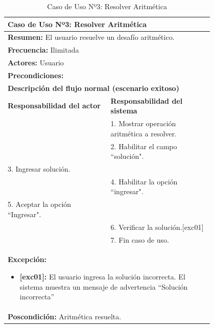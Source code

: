 \begin{table}[H]
    \centering
    \caption{Caso de Uso Nº3: Resolver Aritmética}
    \begin{tabular}{| p{0.4\linewidth} | p{0.4\linewidth} |}
        \hline
        \multicolumn{2}{|l|}{\textbf{Caso de Uso Nº3:}  Resolver Aritmética} \\
        \hline
        \multicolumn{2}{|l|}{\textbf{Resumen:}  El usuario resuelve un desafío aritmético.} \\
        \hline
        \multicolumn{2}{|l|}{\textbf{Frecuencia:}  Ilimitada} \\
        \hline
        \multicolumn{2}{|l|}{\textbf{Actores:}  Usuario} \\
        \hline
        \multicolumn{2}{|l|}{\textbf{Precondiciones:}} \\
        \hline
        \multicolumn{2}{|l|}{\textbf{Descripción del flujo normal (escenario exitoso)} } \\
        \hline
        \textbf{Responsabilidad del actor} & \textbf{Responsabilidad del sistema}\\
            & 1. Mostrar operación aritmética a resolver.\\
            & 2. Habilitar el campo ``solución".\\
        3. Ingresar solución. &\\
            & 4. Habilitar la opción ``ingresar".\\
        5. Aceptar la opción ``Ingresar". &\\
            & 6. Verificar la solución.[exc01]\\
            & 7. Fin caso de uso.\\
        \hline
        \multicolumn{2}{|p{0.8\linewidth}|}{
            \textbf{Excepción:}
            \begin{itemize}
                \item \textbf{[exc01]:} El usuario ingresa la solución incorrecta. El sistema muestra un mensaje de advertencia ``Solución incorrecta”
            \end{itemize}}\\
        \hline
        \multicolumn{2}{|l|}{\textbf{Poscondición:}  Aritmética resuelta.} \\
        \hline
    \end{tabular}
    \label{table:3}
\end{table}

